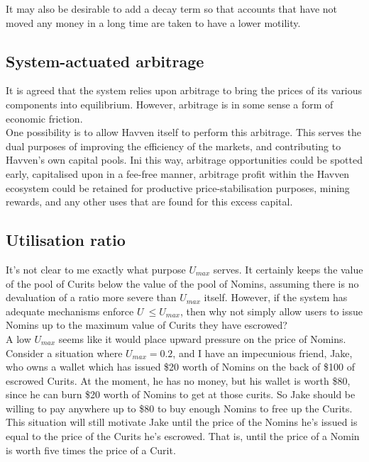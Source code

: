 \noindent It may also be desirable to add a decay term so that accounts that have not moved any money in a long time are taken to have a lower motility.

\subsection{System-actuated arbitrage}

It is agreed that the system relies upon arbitrage to bring the prices of its various components into equilibrium. However, arbitrage is in some sense a form of economic friction. \\

\noindent One possibility is to allow Havven itself to perform this arbitrage. This serves the dual purposes of improving the efficiency of the markets, and contributing to Havven's own capital pools. Ini this way, arbitrage opportunities could be spotted early, capitalised upon in a fee-free manner, arbitrage profit within the Havven ecosystem could be retained for productive price-stabilisation purposes, mining rewards, and any other uses that are found for this excess capital. \\

\pagebreak
\subsection{Utilisation ratio}

It's not clear to me exactly what purpose \(U_{max}\) serves. It certainly keeps the value of the pool of Curits below the value of the pool of Nomins, assuming there is no devaluation of a ratio more severe than \(U_{max}\) itself. However, if the system has adequate mechanisms enforce \(U\ \leq U_{max}\), then why not simply allow users to issue Nomins up to the maximum value of Curits they have escrowed? \\

\noindent A low \(U_{max}\) seems like it would place upward pressure on the price of Nomins. Consider a situation where \(U_{max} = 0.2\), and I have an impecunious friend, Jake, who owns a wallet which has issued \$20 worth of Nomins on the back of \$100 of escrowed Curits. At the moment, he has no
money, but his wallet is worth \$80, since he can burn \$20 worth of Nomins to get at those curits. So Jake should be willing to pay anywhere up to \$80 to buy enough Nomins to free up the Curits. This situation will still motivate Jake until the price of the Nomins he's issued is equal to the price of the Curits he's escrowed. That is, until the price of a Nomin is worth five times the price of a Curit.\\

